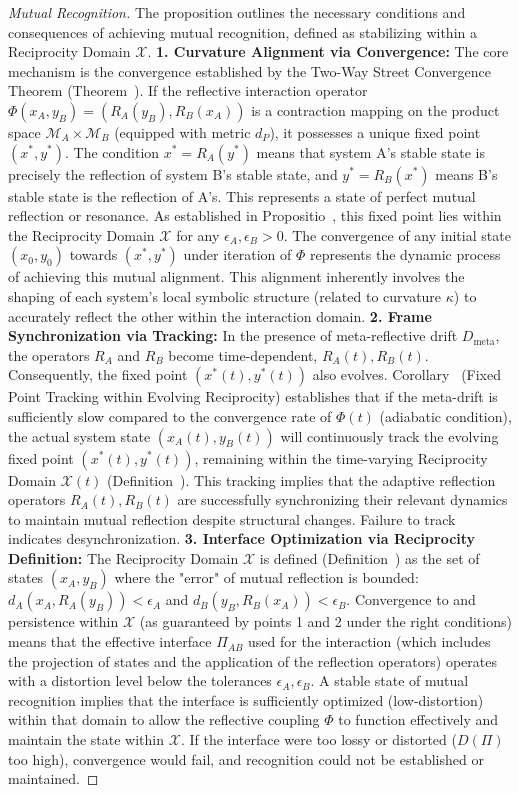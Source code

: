\begin{proof}[Mutual Recognition]
\label{proof:bk9_mutual_recognition}
The proposition outlines the necessary conditions and consequences of achieving mutual recognition, defined as stabilizing within a Reciprocity Domain $\mathcal{X}$.
\textbf{1. Curvature Alignment via Convergence:}
The core mechanism is the convergence established by the Two-Way Street Convergence Theorem (Theorem~). If the reflective interaction operator $\Phi(x_A, y_B) = (R_A(y_B), R_B(x_A))$ is a contraction mapping on the product space $\mathcal{M}_A \times \mathcal{M}_B$ (equipped with metric $d_P$), it possesses a unique fixed point $(x^*, y^*)$. The condition $x^* = R_A(y^*)$ means that system A's stable state is precisely the reflection of system B's stable state, and $y^* = R_B(x^*)$ means B's stable state is the reflection of A's. This represents a state of perfect mutual reflection or resonance. As established in Propositio~, this fixed point lies within the Reciprocity Domain $\mathcal{X}$ for any $\epsilon_A, \epsilon_B > 0$. The convergence of any initial state $(x_0, y_0)$ towards $(x^*, y^*)$ under iteration of $\Phi$ represents the dynamic process of achieving this mutual alignment. This alignment inherently involves the shaping of each system's local symbolic structure (related to curvature $\kappa$) to accurately reflect the other within the interaction domain.
\textbf{2. Frame Synchronization via Tracking:}
In the presence of meta-reflective drift $D_{\text{meta}}$, the operators $R_A$ and $R_B$ become time-dependent, $R_A(t), R_B(t)$. Consequently, the fixed point $(x^*(t), y^*(t))$ also evolves. Corollary~ (Fixed Point Tracking within Evolving Reciprocity) establishes that if the meta-drift is sufficiently slow compared to the convergence rate of $\Phi(t)$ (adiabatic condition), the actual system state $(x_A(t), y_B(t))$ will continuously track the evolving fixed point $(x^*(t), y^*(t))$, remaining within the time-varying Reciprocity Domain $\mathcal{X}(t)$ (Definition~). This tracking implies that the adaptive reflection operators $R_A(t), R_B(t)$ are successfully synchronizing their relevant dynamics to maintain mutual reflection despite structural changes. Failure to track indicates desynchronization.
\textbf{3. Interface Optimization via Reciprocity Definition:}
The Reciprocity Domain $\mathcal{X}$ is defined (Definition~) as the set of states $(x_A, y_B)$ where the "error" of mutual reflection is bounded: $d_A(x_A, R_A(y_B)) < \epsilon_A$ and $d_B(y_B, R_B(x_A)) < \epsilon_B$. Convergence to and persistence within $\mathcal{X}$ (as guaranteed by points 1 and 2 under the right conditions) means that the effective interface $\Pi_{AB}$ used for the interaction (which includes the projection of states and the application of the reflection operators) operates with a distortion level below the tolerances $\epsilon_A, \epsilon_B$. A stable state of mutual recognition implies that the interface is sufficiently optimized (low-distortion) within that domain to allow the reflective coupling $\Phi$ to function effectively and maintain the state within $\mathcal{X}$. If the interface were too lossy or distorted ($D(\Pi)$ too high), convergence would fail, and recognition could not be established or maintained.

\end{proof}
